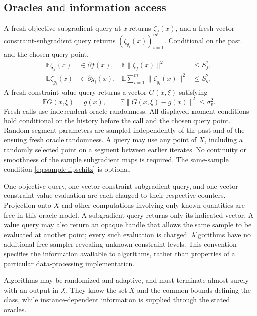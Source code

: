 \documentclass[11pt,a4paper]{article}
\newcommand{\E}{\mathbb E}
\theoremstyle{remark}
\numberwithin{equation}{section}
\begin{document}
\subsection{Oracles and information access}\label{sec:oracles}
A fresh objective-subgradient query at $x$ returns $\zeta_f(x)$, and a fresh vector constraint-subgradient query returns $(\zeta_{g_i}(x))_{i=1}^m$. Conditional on the past and the chosen query point,
\begin{align}
 \E\zeta_f(x)&\in\partial f(x),&
 \E\|\zeta_f(x)\|^2&\le S_f^2,\label{eq:objective-oracle}\\
 \E\zeta_{g_i}(x)&\in\partial g_i(x),&
 \E\sum_{i=1}^m\|\zeta_{g_i}(x)\|^2&\le S_g^2.
 \label{eq:constraint-oracle}
\end{align}
A fresh constraint-value query returns a vector $G(x,\xi)$ satisfying
\begin{equation}
 \E G(x,\xi)=g(x),\qquad
 \E\|G(x,\xi)-g(x)\|^2\le\sigma_v^2.
 \label{eq:value-oracle}
\end{equation}
Fresh calls use independent oracle randomness. All displayed moment conditions hold conditional on the history before the call and the chosen query point. Random segment parameters are sampled independently of the past and of the ensuing fresh oracle randomness. A query may use any point of $X$, including a randomly selected point on a segment between earlier iterates. No continuity or smoothness of the sample subgradient maps is required. The same-sample condition \eqref{eq:sample-lipschitz} is optional.

One objective query, one vector constraint-subgradient query, and one vector constraint-value evaluation are each charged to their respective counters. Projection onto $X$ and other computations involving only known quantities are free in this oracle model. A subgradient query returns only its indicated vector. A value query may also return an opaque handle that allows the same sample to be evaluated at another point; every such evaluation is charged. Algorithms have no additional free sampler revealing unknown constraint levels. This convention specifies the information available to algorithms, rather than properties of a particular data-processing implementation.

Algorithms may be randomized and adaptive, and must terminate almost surely with an output in $X$. They know the set $X$ and the common bounds defining the class, while instance-dependent information is supplied through the stated oracles.
\end{document}
